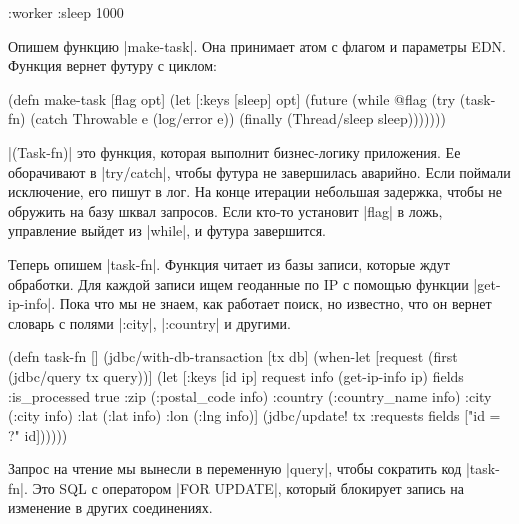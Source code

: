 \begin{english}
  \begin{clojure}
{:worker {:sleep 1000}}
  \end{clojure}
\end{english}

Опишем функцию \spverb|make-task|. Она принимает атом с флагом и параметры
EDN. Функция вернет футуру с циклом:

\begin{english}
  \begin{clojure}
(defn make-task
  [flag opt]
  (let [{:keys [sleep]} opt]
    (future
      (while @flag
        (try
          (task-fn)
          (catch Throwable e
            (log/error e))
          (finally
            (Thread/sleep sleep)))))))
  \end{clojure}
\end{english}

\spverb|(Task-fn)| это функция, которая выполнит бизнес-логику приложения. Ее
оборачивают в \spverb|try/catch|, чтобы футура не завершилась аварийно. Если
поймали исключение, его пишут в лог. На конце итерации небольшая задержка, чтобы
не обружить на базу шквал запросов. Если кто-то установит \spverb|flag| в ложь,
управление выйдет из \spverb|while|, и футура завершится.

Теперь опишем \spverb|task-fn|. Функция читает из базы записи, которые ждут
обработки. Для каждой записи ищем геоданные по IP с помощью функции
\spverb|get-ip-info|. Пока что мы не знаем, как работает поиск, но известно, что
он вернет словарь с полями \spverb|:city|, \spverb|:country| и другими.

\begin{english}
  \begin{clojure}
(defn task-fn []
  (jdbc/with-db-transaction [tx db]
    (when-let [request (first (jdbc/query tx query))]
      (let [{:keys [id ip]} request
            info   (get-ip-info ip)
            fields {:is_processed true
                    :zip (:postal_code info)
                    :country (:country_name info)
                    :city (:city info)
                    :lat (:lat info)
                    :lon (:lng info)}]
        (jdbc/update! tx :requests
                      fields
                      ["id = ?" id])))))
  \end{clojure}
\end{english}

Запрос на чтение мы вынесли в переменную \spverb|query|, чтобы сократить код
\spverb|task-fn|. Это SQL с оператором \spverb|FOR UPDATE|, который блокирует
запись на изменение в других соединениях.

